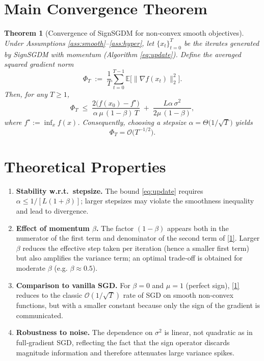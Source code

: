 \documentclass{article}
\newtheorem{theorem}{Theorem}
\newcommand{\E}{\mathbb{E}}
\begin{document}
\section*{Main Convergence Theorem}
\begin{theorem}[Convergence of SignSGDM for non‑convex smooth objectives]
\label{thm:main}
Under Assumptions \ref{ass:smooth}--\ref{ass:hyper}, let $\{x_t\}_{t=0}^{T}$ be the iterates generated by SignSGDM with momentum (Algorithm \ref{eq:update}). Define the averaged squared gradient norm
\[
\Phi_T\;:=\;\frac{1}{T}\sum_{t=0}^{T-1}\E\!\bigl[\|\nabla f(x_t)\|_2^{2}\bigr].
\]
Then, for any $T\ge1$,
\[
\Phi_T\;\le\;
\frac{2\bigl(f(x_0)-f^\star\bigr)}{\alpha\,\mu\, (1-\beta)\,T}
\;+\;
\frac{L\alpha\,\sigma^{2}}{2\mu\,(1-\beta)} ,
\tag{1}
\]
where $f^\star:=\inf_{x}f(x)$. Consequently, choosing a stepsize $\alpha = \Theta\!\bigl(1/\sqrt{T}\bigr)$ yields
\[
\Phi_T = \mathcal{O}\!\bigl(T^{-1/2}\bigr).
\]
\end{theorem}

\section*{Theoretical Properties}
\begin{enumerate}[label={\arabic*.},leftmargin=*,itemsep=1ex]
\item \textbf{Stability w.r.t.\ stepsize.} The bound \eqref{eq:update} requires $\alpha\le 1/[L(1+\beta)]$; larger stepsizes may violate the smoothness inequality and lead to divergence.
\item \textbf{Effect of momentum $\beta$.} The factor $(1-\beta)$ appears both in the numerator of the first term and denominator of the second term of \eqref{1}. Larger $\beta$ reduces the effective step taken per iteration (hence a smaller first term) but also amplifies the variance term; an optimal trade‑off is obtained for moderate $\beta$ (e.g. $\beta\approx0.5$).
\item \textbf{Comparison to vanilla SGD.} For $\beta=0$ and $\mu=1$ (perfect sign), \eqref{1} reduces to the classic $\mathcal{O}(1/\sqrt{T})$ rate of SGD on smooth non‑convex functions, but with a smaller constant because only the sign of the gradient is communicated.
\item \textbf{Robustness to noise.} The dependence on $\sigma^{2}$ is linear, not quadratic as in full‑gradient SGD, reflecting the fact that the sign operator discards magnitude information and therefore attenuates large variance spikes.
\end{enumerate}
\end{document}
